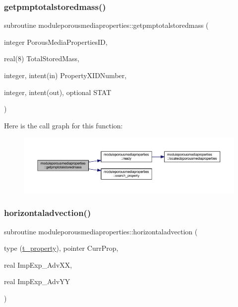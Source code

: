 \subsubsection{\texorpdfstring{getpmptotalstoredmass()}{getpmptotalstoredmass()}}
{\footnotesize\ttfamily subroutine moduleporousmediaproperties\+::getpmptotalstoredmass (\begin{DoxyParamCaption}\item[{integer}]{Porous\+Media\+Properties\+ID,  }\item[{real(8)}]{Total\+Stored\+Mass,  }\item[{integer, intent(in)}]{Property\+X\+I\+D\+Number,  }\item[{integer, intent(out), optional}]{S\+T\+AT }\end{DoxyParamCaption})\hspace{0.3cm}{\ttfamily [private]}}

Here is the call graph for this function\+:\nopagebreak
\begin{figure}[H]
\begin{center}
\leavevmode
\includegraphics[width=350pt]{namespacemoduleporousmediaproperties_a2c248d4114a4213bca448f9d77478f28_cgraph}
\end{center}
\end{figure}
\mbox{\label{namespacemoduleporousmediaproperties_a7327a640c1b4db8bbf9db21d1a859a88}} 
\subsubsection{\texorpdfstring{horizontaladvection()}{horizontaladvection()}}
{\footnotesize\ttfamily subroutine moduleporousmediaproperties\+::horizontaladvection (\begin{DoxyParamCaption}\item[{type (\mbox{\hyperlink{structmoduleporousmediaproperties_1_1t__property}{t\+\_\+property}}), pointer}]{Curr\+Prop,  }\item[{real}]{Imp\+Exp\+\_\+\+Adv\+XX,  }\item[{real}]{Imp\+Exp\+\_\+\+Adv\+YY }\end{DoxyParamCaption})\hspace{0.3cm}{\ttfamily [private]}}

